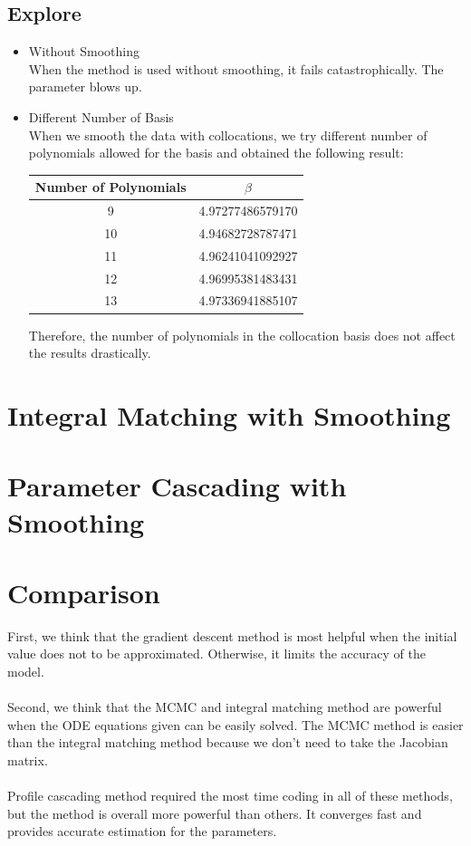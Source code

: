 \documentclass{article}
\begin{document}
\subsection{Explore}
\begin{itemize}
\item Without Smoothing\\
When the method is used without smoothing, it fails catastrophically. The parameter blows up.
\item Different Number of Basis\\
When we smooth the data with collocations, we try different number of polynomials allowed for the basis and obtained the following result:\\
\begin{center}
\begin{tabular}{|c|c|}
\hline
Number of Polynomials & $\beta$\\
\hline
9 & 4.97277486579170\\
10 & 4.94682728787471\\
11 & 4.96241041092927\\
12 & 4.96995381483431\\
13 & 4.97336941885107\\
\hline
\end{tabular}
\end{center}
Therefore, the number of polynomials in the collocation basis does not affect the results drastically. 
\end{itemize}
\section{Integral Matching with Smoothing}
\section{Parameter Cascading with Smoothing}
\section{Comparison}
First, we think that the gradient descent method is most helpful when the initial value does not to be  approximated. Otherwise, it limits the accuracy of the model.\\\\
Second, we think that the MCMC and integral matching method are powerful when the ODE equations given can be easily solved. The MCMC method is easier than the integral matching method because we don't need to take the Jacobian matrix.\\\\
Profile cascading method required the most time coding in all of these methods, but the method is overall more powerful than others. It converges fast and provides accurate estimation for the parameters.
\end{document}
